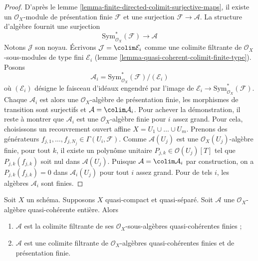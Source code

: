 \begin{proof}
D'après le lemme \ref{lemma-finite-directed-colimit-surjective-maps},
il existe un $\mathcal{O}_X$-module de présentation finie
$\mathcal{F}$ et une surjection $\mathcal{F} \to \mathcal{A}$.
La structure d'algèbre fournit une surjection
$$
\text{Sym}^*_{\mathcal{O}_X}(\mathcal{F}) \longrightarrow \mathcal{A}
$$
Notons $\mathcal{J}$ son noyau. Écrivons $\mathcal{J} = \colim \mathcal{E}_i$
comme une colimite filtrante de $\mathcal{O}_X$-sous-modules de type fini
$\mathcal{E}_i$ (lemme \ref{lemma-quasi-coherent-colimit-finite-type}). Posons
$$
\mathcal{A}_i = \text{Sym}^*_{\mathcal{O}_X}(\mathcal{F})/(\mathcal{E}_i)
$$
où $(\mathcal{E}_i)$ désigne le faisceau d'idéaux engendré par
l'image de $\mathcal{E}_i \to \text{Sym}^*_{\mathcal{O}_X}(\mathcal{F})$.
Chaque $\mathcal{A}_i$ est alors une $\mathcal{O}_X$-algèbre de présentation finie,
les morphismes de transition sont surjectifs
et $\mathcal{A} = \colim \mathcal{A}_i$. Pour achever la démonstration, il
reste à montrer que $\mathcal{A}_i$ est une $\mathcal{O}_X$-algèbre finie
pour $i$ assez grand. Pour cela, choisissons un recouvrement ouvert
affine $X = U_1 \cup \ldots \cup U_m$. Prenons des générateurs
$f_{j, 1}, \ldots, f_{j, N_j} \in \Gamma(U_i, \mathcal{F})$.
Comme $\mathcal{A}(U_j)$ est une $\mathcal{O}_X(U_j)$-algèbre finie,
pour tout $k$, il existe un polynôme unitaire
$P_{j, k} \in \mathcal{O}(U_j)[T]$ tel que $P_{j, k}(f_{j, k})$
soit nul dans $\mathcal{A}(U_j)$. Puisque
$\mathcal{A} = \colim \mathcal{A}_i$ par construction,
on a $P_{j, k}(f_{j, k}) = 0$ dans $\mathcal{A}_i(U_j)$
pour tout $i$ assez grand. Pour de tels $i$, les algèbres
$\mathcal{A}_i$ sont finies.
\end{proof}

\begin{lemma}
\label{lemma-integral-algebra-directed-colimit-finite}
Soit $X$ un schéma. Supposons $X$ quasi-compact et quasi-séparé.
Soit $\mathcal{A}$ une $\mathcal{O}_X$-algèbre quasi-cohérente entière.
Alors
\begin{enumerate}
\item $\mathcal{A}$ est la colimite filtrante de ses
$\mathcal{O}_X$-sous-algèbres quasi-cohérentes finies ;
\item $\mathcal{A}$ est une colimite filtrante de
$\mathcal{O}_X$-algèbres quasi-cohérentes finies et de présentation finie.
\end{enumerate}
\end{lemma}

